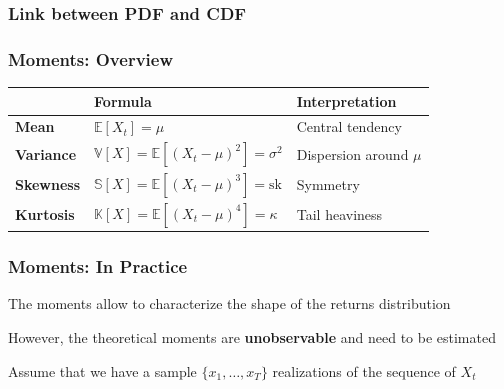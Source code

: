 \documentclass{beamer}
\newenvironment{wideitemize}{\itemize\addtolength{\itemsep}{10pt}}{\enditemize}
\begin{document}
\begin{frame}
\frametitle{Link between PDF and CDF}
\end{frame}


\begin{frame}
  \frametitle{Moments: Overview}
  \begin{table}
    \centering
    \begin{tabular}{lll}
      \hline
      \hline
      & Formula & Interpretation \\
      \hline
      \textbf{Mean} & $\mathbb{E}[X_t] = \mu$ & Central tendency\\
      \textbf{Variance} & $\mathbb{V}[X] = \mathbb{E}\left[(X_t - \mu)^2\right] = \sigma^2$ & Dispersion around $\mu$\\
      \textbf{Skewness} & $\mathbb{S}[X] = \mathbb{E}\left[(X_t - \mu)^3\right] = \text{sk}$ & Symmetry\\
      \textbf{Kurtosis} & $\mathbb{K}[X] = \mathbb{E}\left[(X_t - \mu)^4\right] = \kappa$ & Tail heaviness\\
      \hline
      \hline                                                                                            
    \end{tabular}
  \end{table}
\end{frame}



\begin{frame}
  \frametitle{Moments: In Practice}

  \begin{wideitemize}
    \item The moments allow to characterize the shape of the returns distribution
    \item However, the theoretical moments are \textbf{unobservable} and need to be estimated
    \item Assume that we have a sample $\{x_1, \dots, x_T\}$ realizations of the sequence of $X_t$
  \end{wideitemize}
  
\end{frame}
\end{document}
